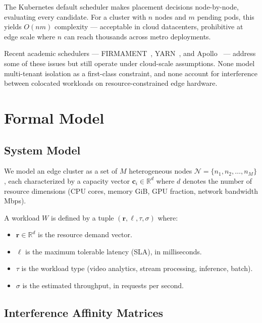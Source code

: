 \documentclass[12pt,letterpaper,twoside]{report}
\begin{document}
\begin{tcolorbox}[colback=accentBurgundy!5,colframe=accentBurgundy!50,title=\textbf{Limitation}]
The Kubernetes default scheduler makes placement decisions node-by-node, evaluating every candidate. For a cluster with \(n\) nodes and \(m\) pending pods, this yields \(O(n m)\) complexity --- acceptable in cloud datacenters, prohibitive at edge scale where \(n\) can reach thousands across metro deployments.
\end{tcolorbox}

Recent academic schedulers --- FIRMAMENT~\cite{gog2016}, YARN~\cite{vavilapalli2013}, and Apollo~\cite{boutin2014} --- address some of these issues but still operate under cloud-scale assumptions. None model multi-tenant isolation as a first-class constraint, and none account for interference between colocated workloads on resource-constrained edge hardware.

\chapter{Formal Model}\label{ch:model}

\section{System Model}

We model an edge cluster as a set of \(M\) heterogeneous nodes
\(\mathcal{N} = \{n_1, n_2, \ldots, n_M\}\),
each characterized by a capacity vector
\(\mathbf{c}_i \in \mathbb{R}^d\) where \(d\) denotes the number of resource dimensions
(CPU cores, memory GiB, GPU fraction, network bandwidth Mbps).

\vspace{6pt}
A workload \(W\) is defined by a tuple
\((\mathbf{r}, \ell, \tau, \sigma)\) where:
\begin{itemize}[leftmargin=2em,itemsep=2pt]
    \item \(\mathbf{r} \in \mathbb{R}^d\) is the resource demand vector.
    \item \(\ell\) is the maximum tolerable latency (SLA), in milliseconds.
    \item \(\tau\) is the workload type (video analytics, stream processing, inference, batch).
    \item \(\sigma\) is the estimated throughput, in requests per second.
\end{itemize}

\section{Interference Affinity Matrices}
\end{document}
